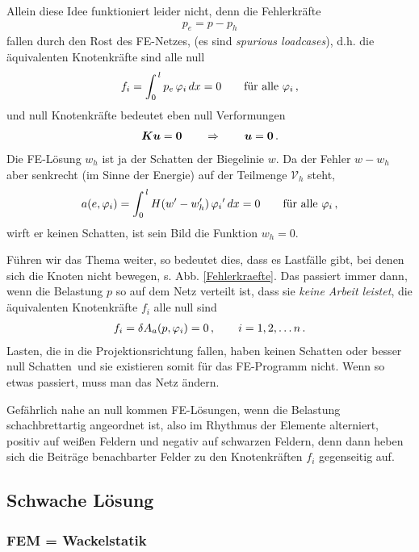 Allein diese Idee funktioniert leider nicht, denn die Fehlerkr\"{a}fte
\begin{align}
p_e = p - p_{h}
\end{align}
fallen durch den Rost  des FE-Netzes, (es sind {\em spurious loadcases\/}), d.h. die \"{a}quivalenten Knotenkr\"{a}fte sind alle null
\begin{align}
f_i = \int_0^{\,l}  p_e\, \varphi_i \,dx = 0 \qquad \textrm{f\"{u}r alle $\varphi_i$}\,,
\end{align}
und null Knotenkr\"{a}fte bedeutet eben null Verformungen
\begin{align}
 \mbox{\boldmath $K$} \mbox{\boldmath $u$} = \mbox{\boldmath $0$} \qquad \Rightarrow \qquad  \mbox{\boldmath $u$} = \mbox{\boldmath $0$} \,.
\end{align}
Die FE-L\"{o}sung $w_{h}$ ist ja der Schatten der Biegelinie $w$. Da der Fehler $w -w_{h}$ aber senkrecht (im Sinne der Energie) auf der Teilmenge $\mathcal{V}_{h}$ steht,
\begin{align}
a(e,\varphi_i) = \int_0^{\,l} H (w' - w_h')\,\varphi_i{'} \,dx = 0 \qquad\mbox{f\"{u}r alle} \,\,\varphi_i\,,
\end{align}
wirft er keinen Schatten, ist sein Bild die Funktion $w_{h} = 0$.

F\"{u}hren wir das Thema weiter, so bedeutet dies, dass es Lastf\"{a}lle gibt, bei denen sich die Knoten nicht bewegen, s. Abb. \ref{Fehlerkraefte}. Das passiert immer dann, wenn die Belastung $p$ so auf dem Netz verteilt ist, dass sie {\em keine Arbeit leistet}, die \"{a}quivalenten Knotenkr\"{a}fte $f_i$ alle null sind
\begin{align}
 f_i = \delta A_a(p,\varphi_i) = 0\,, \qquad  i = 1,2,\ldots n \,.
\end{align}
Lasten, die in die Projektionsrichtung fallen, haben keinen Schatten oder besser \glq null Schatten\grq\, und sie existieren somit f\"{u}r das FE-Programm nicht. Wenn so etwas passiert, muss man das Netz \"{a}ndern.

Gef\"{a}hrlich nahe an null kommen FE-L\"{o}sungen, wenn die Belastung schachbrettartig angeordnet ist, also im Rhythmus der Elemente alterniert, positiv auf wei{\ss}en Feldern und negativ auf schwarzen Feldern, denn dann heben sich die Beitr\"{a}ge benachbarter Felder zu den Knotenkr\"{a}ften $f_i$ gegenseitig auf.

\vspace{-0.5cm}
{\textcolor{sectionTitleBlue}{\section{Schwache L\"{o}sung}}}\label{Prinzip der virtuellen Verrueckungen}
\vspace{-0.3cm}
{\textcolor{sectionTitleBlue}{\subsubsection*{FEM = \glq Wackelstatik\grq}}}


